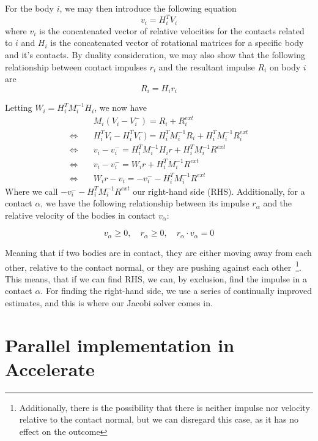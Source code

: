 \documentclass[runningheads,a4paper]{llncs}
\begin{document}
For the body $i$, we may then introduce the following equation
\begin{equation}
  v_i = H_i^TV_i
\end{equation}
where $v_i$ is the concatenated vector of relative velocities for the contacts
related to $i$ and $H_i$ is the concatenated vector of rotational matrices for a
specific body and it's contacts. By duality consideration, we may also show that
the following relationship between contact impulses $r_i$ and the resultant
impulse $R_i$ on body $i$ are
\begin{equation}
R_i = H_i r_i
\end{equation}

Letting $W_i = H_i^TM_i^{-1}H_i$, we now have
\begin{align}
  & M_i(V_i - V_i^-) = R_i + R_i^{ext} \\
  \Leftrightarrow \quad & H_i^T V_i - H_i^T V_i^-) = H_i^TM_i^{-1} R_i + H_i^T
  M_i^{-1} R_i^{ext}
  \\
  \Leftrightarrow \quad & v_i - v_i^{-} = H_i^T M_i^{-1}H_i r + H_i^T M_i^{-1} R^{ext} \\
  \Leftrightarrow \quad & v_i - v_i^{-} = W_i r + H_i^T M_i^{-1} R^{ext} \\
  \Leftrightarrow \quad & W_i r - v_i = -v_i^{-} - H_i^T M_i^{-1} R^{ext}
\end{align}
Where we call $-v_i^{-} - H_i^T M_i^{-1} R^{ext}$ our right-hand side (RHS).
Additionally, for a contact $\alpha$, we have the following relationship between
its impulse $r_\alpha$ and the relative velocity of the bodies in contact
$v_\alpha$:

\begin{equation}
  v_\alpha \geq 0, \quad r_\alpha \geq 0, \quad r_\alpha \cdot v_\alpha = 0
\end{equation}

Meaning that if two bodies are in contact, they are either moving away from
each other, relative to the contact normal, or they are pushing against each
other~\footnote{Additionally, there is the possibility that there is neither
  impulse nor velocity relative to the contact normal, but we can disregard
  this case, as it has no effect on the outcome}. This means, that if we can
find RHS, we can, by exclusion, find the impulse in a contact $\alpha$. For
finding the right-hand side, we use a series of continually improved estimates,
and this is where our Jacobi solver comes in.

\section{Parallel implementation in Accelerate}
\end{document}
